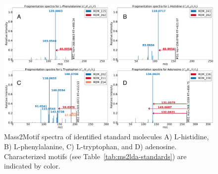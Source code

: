 \begin{figure}[!htbp]
\centering\includegraphics[width=0.8\linewidth]{07-lda/figures/standards.pdf}
\centering\caption{Mass2Motif spectra of identified standard molecules A) L-histidine, B) L-phenylalanine, C) L-tryptophan, and D) adenosine. Characterized motifs (see Table~\ref{tab:ms2lda-standards}) are indicated by color.\label{fig:m2lda-standards}}
\end{figure}


